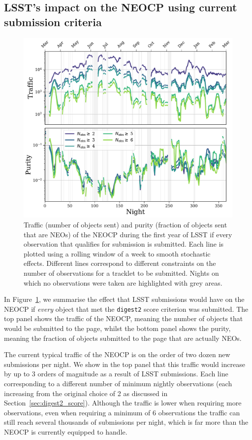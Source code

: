 \documentclass[twocolumn]{aastex631}
\newcommand{\dig}{\texttt{digest2}}
\begin{document}
\subsection{LSST's impact on the NEOCP using current submission criteria}\label{sec:traffic_basic}
\begin{figure}
    \centering
    \includegraphics[width=\textwidth]{traffic_purity.pdf}
    \caption{Traffic (number of objects sent) and purity (fraction of objects sent that are NEOs) of the NEOCP during the first year of LSST if every observation that qualifies for submission is submitted. Each line is plotted using a rolling window of a week to smooth stochastic effects. Different lines correspond to different constraints on the number of observations for a tracklet to be submitted. Nights on which no observations were taken are highlighted with grey areas.}
    \label{fig:neocp_traffic}
\end{figure}

In Figure~\ref{fig:neocp_traffic}, we summarise the effect that LSST submissions would have on the NEOCP if \textit{every} object that met the \dig{} score criterion was submitted. The top panel shows the traffic of the NEOCP, meaning the number of objects that would be submitted to the page, whilst the bottom panel shows the purity, meaning the fraction of objects submitted to the page that are actually NEOs.

The current typical traffic of the NEOCP is on the order of two dozen new submissions per night. We show in the top panel that this traffic would increase by up to 3 orders of magnitude as a result of LSST submissions. Each line corresponding to a different number of minimum nightly observations (each increasing from the original choice of 2 as discussed in Section~\ref{sec:digest2_score}). Although the traffic is lower when requiring more observations, even when requiring a minimum of 6 observations the traffic can still reach several thousands of submissions per night, which is far more than the NEOCP is currently equipped to handle.
\end{document}
